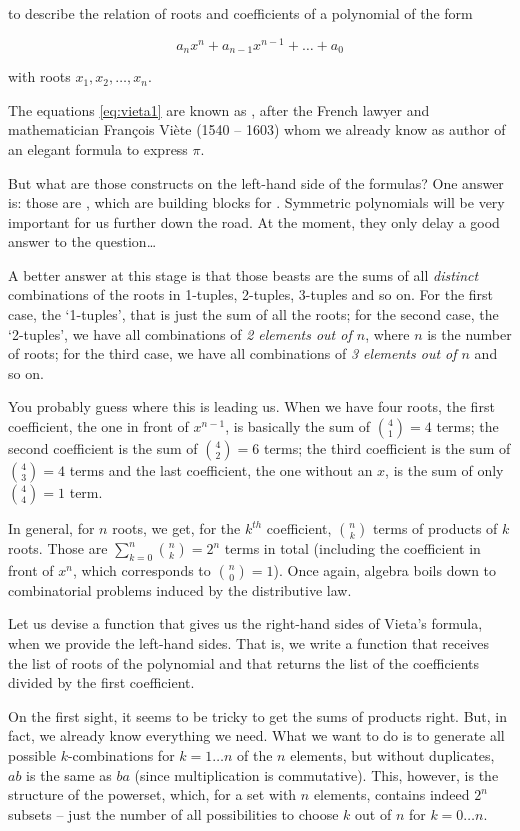 \documentclass[tikz]{scrreprt}
\begin{document}
to describe the relation of roots and coefficients
of a polynomial of the form

\[
a_nx^n + a_{n-1}x^{n-1} + \dots + a_0
\]

with roots $x_1, x_2, \dots, x_n$.

The equations \ref{eq:vieta1} are known as
, after the French lawyer
and mathematician François Viète (1540 -- 1603)
whom we already know as author of an elegant
formula to express $\pi$.

But what are those constructs on the left-hand
side of the formulas? One answer is:
those are ,
which are building blocks for .
Symmetric polynomials will be very important for us
further down the road. At the moment, they only delay
a good answer to the question\dots

A better answer at this stage is
that those beasts are the sums of
all \emph{distinct} combinations
of the roots in 1-tuples, 2-tuples, 3-tuples
and so on.
For the first case, the `1-tuples',
that is just the sum of all the roots;
for the second case, the `2-tuples',
we have all combinations of 
\emph{2 elements out of $n$}, where $n$
is the number of roots;
for the third case, we have all combinations
of \emph{3 elements out of $n$} and so on.

You probably guess where this is leading us.
When we have four roots,
the first coefficient,
the one in front of $x^{n-1}$,
is basically the sum
of $\binom{4}{1} = 4$ terms;
the second coefficient is the sum of
$\binom{4}{2} = 6$ terms;
the third coefficient is the sum of
$\binom{4}{3} = 4$ terms and
the last coefficient,
the one without an $x$, is the sum of
only $\binom{4}{4} = 1$ term.

In general, for $n$ roots, we get,
for the $k^{th}$ coefficient,
$\binom{n}{k}$ terms
of products of $k$ roots.
Those are $\sum_{k=0}^n{\binom{n}{k}} = 2^n$
terms in total 
(including the coefficient in front of $x^n$,
which corresponds to $\binom{n}{0}=1$).
Once again, algebra boils down to combinatorial
problems induced by the distributive law.

Let us devise a function 
that gives us the right-hand sides of Vieta's formula,
when we provide the left-hand sides.
That is, we write a function that receives the list
of roots of the polynomial and that returns the list
of the coefficients divided by the first coefficient.

On the first sight, it seems to be tricky to get
the sums of products right. But, in fact, we already
know everything we need. 
What we want to do is to generate
all possible $k$-combinations for $k=1\dots n$
of the $n$ elements, but without duplicates, \ie\
$ab$ is the same as $ba$ (since multiplication
is commutative).
This, however, is the structure of the powerset,
which, for a set with $n$ elements, contains indeed
$2^n$ subsets -- just the number of all possibilities
to choose $k$ out of $n$ for $k=0\dots n$.
\end{document}
